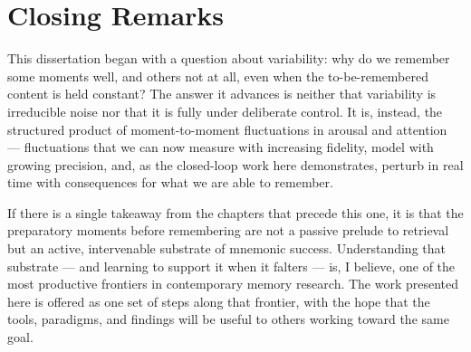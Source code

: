 \section{Closing Remarks}

This dissertation began with a question about variability: why do we remember some moments well, and others not at all, even when the to-be-remembered content is held constant? The answer it advances is neither that variability is irreducible noise nor that it is fully under deliberate control. It is, instead, the structured product of moment-to-moment fluctuations in arousal and attention --- fluctuations that we can now measure with increasing fidelity, model with growing precision, and, as the closed-loop work here demonstrates, perturb in real time with consequences for what we are able to remember.

If there is a single takeaway from the chapters that precede this one, it is that the preparatory moments before remembering are not a passive prelude to retrieval but an active, intervenable substrate of mnemonic success. Understanding that substrate --- and learning to support it when it falters --- is, I believe, one of the most productive frontiers in contemporary memory research. The work presented here is offered as one set of steps along that frontier, with the hope that the tools, paradigms, and findings will be useful to others working toward the same goal.
